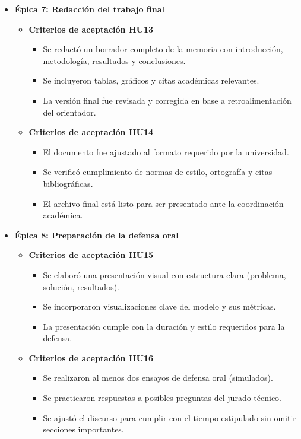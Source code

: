 \documentclass[
11pt, %
]{charter}
\begin{document}
\begin{itemize}
  \item \textbf{Épica 7: Redacción del trabajo final}
    \begin{itemize}
      \item \textbf{Criterios de aceptación HU13}
      \begin{itemize}
        \item Se redactó un borrador completo de la memoria con introducción, metodología, resultados y conclusiones.
        \item Se incluyeron tablas, gráficos y citas académicas relevantes.
        \item La versión final fue revisada y corregida en base a retroalimentación del orientador.
      \end{itemize}

      \item \textbf{Criterios de aceptación HU14}
      \begin{itemize}
        \item El documento fue ajustado al formato requerido por la universidad.
        \item Se verificó cumplimiento de normas de estilo, ortografía y citas bibliográficas.
        \item El archivo final está listo para ser presentado ante la coordinación académica.
      \end{itemize}
    \end{itemize}

  \item \textbf{Épica 8: Preparación de la defensa oral}
    \begin{itemize}
      \item \textbf{Criterios de aceptación HU15}
      \begin{itemize}
        \item Se elaboró una presentación visual con estructura clara (problema, solución, resultados).
        \item Se incorporaron visualizaciones clave del modelo y sus métricas.
        \item La presentación cumple con la duración y estilo requeridos para la defensa.
      \end{itemize}

      \item \textbf{Criterios de aceptación HU16}
      \begin{itemize}
        \item Se realizaron al menos dos ensayos de defensa oral (simulados).
        \item Se practicaron respuestas a posibles preguntas del jurado técnico.
        \item Se ajustó el discurso para cumplir con el tiempo estipulado sin omitir secciones importantes.
      \end{itemize}
    \end{itemize}
\end{itemize}
\end{document}
